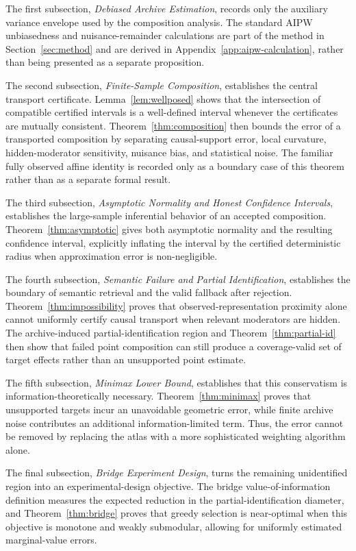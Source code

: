\documentclass[11pt]{article}
\numberwithin{equation}{section}
\newcommand{\1}{\mathbf 1}
\begin{document}
The first subsection, \emph{Debiased Archive Estimation}, records only the auxiliary variance envelope used by the composition analysis.  The standard AIPW unbiasedness and nuisance-remainder calculations are part of the method in Section~\ref{sec:method} and are derived in Appendix~\ref{app:aipw-calculation}, rather than being presented as a separate proposition.

The second subsection, \emph{Finite-Sample Composition}, establishes the central transport certificate.  Lemma~\ref{lem:wellposed} shows that the intersection of compatible certified intervals is a well-defined interval whenever the certificates are mutually consistent.  Theorem~\ref{thm:composition} then bounds the error of a transported composition by separating causal-support error, local curvature, hidden-moderator sensitivity, nuisance bias, and statistical noise.  The familiar fully observed affine identity is recorded only as a boundary case of this theorem rather than as a separate formal result.

The third subsection, \emph{Asymptotic Normality and Honest Confidence Intervals}, establishes the large-sample inferential behavior of an accepted composition.  Theorem~\ref{thm:asymptotic} gives both asymptotic normality and the resulting confidence interval, explicitly inflating the interval by the certified deterministic radius when approximation error is non-negligible.

The fourth subsection, \emph{Semantic Failure and Partial Identification}, establishes the boundary of semantic retrieval and the valid fallback after rejection.  Theorem~\ref{thm:impossibility} proves that observed-representation proximity alone cannot uniformly certify causal transport when relevant moderators are hidden.  The archive-induced partial-identification region and Theorem~\ref{thm:partial-id} then show that failed point composition can still produce a coverage-valid set of target effects rather than an unsupported point estimate.

The fifth subsection, \emph{Minimax Lower Bound}, establishes that this conservatism is information-theoretically necessary.  Theorem~\ref{thm:minimax} proves that unsupported targets incur an unavoidable geometric error, while finite archive noise contributes an additional information-limited term.  Thus, the error cannot be removed by replacing the atlas with a more sophisticated weighting algorithm alone.

The final subsection, \emph{Bridge Experiment Design}, turns the remaining unidentified region into an experimental-design objective.  The bridge value-of-information definition measures the expected reduction in the partial-identification diameter, and Theorem~\ref{thm:bridge} proves that greedy selection is near-optimal when this objective is monotone and weakly submodular, allowing for uniformly estimated marginal-value errors.
\end{document}
